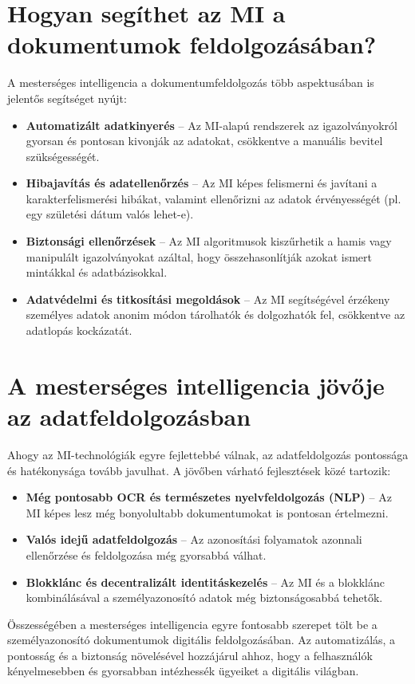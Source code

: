 \documentclass[
]{thesis-ekf}
\theoremstyle{definition}
\theoremstyle{remark}
\begin{document}
	\section{Hogyan segíthet az MI a dokumentumok feldolgozásában?}
	A mesterséges intelligencia a dokumentumfeldolgozás több aspektusában is jelentős segítséget nyújt:
	\begin{itemize}
		\item \textbf{Automatizált adatkinyerés} -- Az MI-alapú rendszerek az igazolványokról gyorsan és pontosan kivonják az adatokat, csökkentve a manuális bevitel szükségességét.
		\item \textbf{Hibajavítás és adatellenőrzés} -- Az MI képes felismerni és javítani a karakterfelismerési hibákat, valamint ellenőrizni az adatok érvényességét (pl. egy születési dátum valós lehet-e).
		\item \textbf{Biztonsági ellenőrzések} -- Az MI algoritmusok kiszűrhetik a hamis vagy manipulált igazolványokat azáltal, hogy összehasonlítják azokat ismert mintákkal és adatbázisokkal.
		\item \textbf{Adatvédelmi és titkosítási megoldások} -- Az MI segítségével érzékeny személyes adatok anonim módon tárolhatók és dolgozhatók fel, csökkentve az adatlopás kockázatát.
	\end{itemize}
	\section{A mesterséges intelligencia jövője az adatfeldolgozásban}
	Ahogy az MI-technológiák egyre fejlettebbé válnak, az adatfeldolgozás pontossága és hatékonysága tovább javulhat. A jövőben várható fejlesztések közé tartozik:
	\begin{itemize}
		\item \textbf{Még pontosabb OCR és természetes nyelvfeldolgozás (NLP)} -- Az MI képes lesz még bonyolultabb dokumentumokat is pontosan értelmezni.
		\item \textbf{Valós idejű adatfeldolgozás} -- Az azonosítási folyamatok azonnali ellenőrzése és feldolgozása még gyorsabbá válhat.
		\item \textbf{Blokklánc és decentralizált identitáskezelés} -- Az MI és a blokklánc kombinálásával a személyazonosító adatok még biztonságosabbá tehetők.
	\end{itemize}
	Összességében a mesterséges intelligencia egyre fontosabb szerepet tölt be a személyazonosító dokumentumok digitális feldolgozásában. Az automatizálás, a pontosság és a biztonság növelésével hozzájárul ahhoz, hogy a felhasználók kényelmesebben és gyorsabban intézhessék ügyeiket a digitális világban.
	
\end{document}

